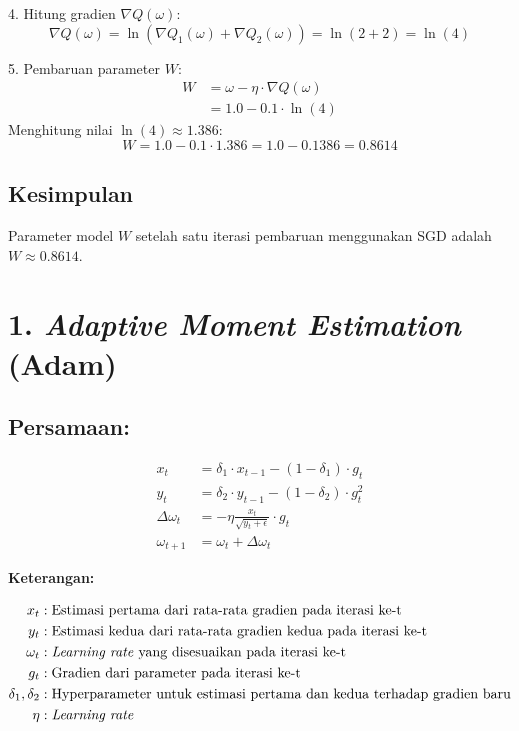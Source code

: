 4. Hitung gradien \( \nabla Q(\omega) \):
   \[
   \nabla Q(\omega) = \ln\left(\nabla Q_1(\omega) + \nabla Q_2(\omega)\right) = \ln(2 + 2) = \ln(4)
   \]

5. Pembaruan parameter \( W \):
   \begin{align*}
       W & = \omega - \eta \cdot \nabla Q(\omega) \\
       & = 1.0 - 0.1 \cdot \ln(4)
   \end{align*}
   Menghitung nilai \( \ln(4) \approx 1.386 \):
   \[
   W = 1.0 - 0.1 \cdot 1.386 = 1.0 - 0.1386 = 0.8614
   \]

\subsection*{Kesimpulan}
Parameter model \( W \) setelah satu iterasi pembaruan menggunakan SGD adalah \( W \approx 0.8614 \).

\vspace{3 cm}


\section*{1. \textit{Adaptive Moment Estimation } (Adam)}

\subsection*{Persamaan:}
    \begin{equation}
    \begin{aligned}
        x_t &= \delta_1 \cdot x_{t-1} - (1 - \delta_1) \cdot g_t \\
        y_t &= \delta_2 \cdot y_{t-1} - (1 - \delta_2) \cdot g_t^2 \\
        \Delta \omega_t &= -\eta \frac{x_t}{\sqrt{y_t + \epsilon}} \cdot g_t \\
        \omega_{t+1} &= \omega_t + \Delta \omega_t
    \end{aligned}
    \label{Adam}
    \end{equation}

 \textbf{Keterangan:}

    \begin{align*}
    x_t &: \text{Estimasi pertama dari rata-rata gradien pada iterasi ke-t}\\
    y_t &: \text{Estimasi kedua dari rata-rata gradien kedua pada iterasi ke-t}\\
    \omega_t &: \text{\textit{Learning rate} yang disesuaikan pada iterasi ke-t}\\
    g_t &: \text{Gradien dari parameter pada iterasi ke-t}\\
    \delta_1, \delta_2 &: \text{Hyperparameter untuk estimasi pertama dan kedua terhadap gradien baru}\\
    \eta &: \text{\textit{Learning rate}}\\
\end{align*}




